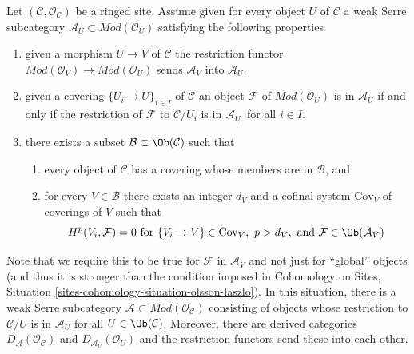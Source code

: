 \medskip\noindent
Let $(\mathcal{C}, \mathcal{O}_\mathcal{C})$ be a ringed site.
Assume given for every object $U$ of $\mathcal{C}$
a weak Serre subcategory $\mathcal{A}_U \subset \textit{Mod}(\mathcal{O}_U)$
satisfying the following properties
\begin{enumerate}
\item
\label{spaces-simplicial-item-restriction}
given a morphism $U \to V$ of $\mathcal{C}$ the restriction
functor $\textit{Mod}(\mathcal{O}_V) \to \textit{Mod}(\mathcal{O}_U)$
sends $\mathcal{A}_V$ into $\mathcal{A}_U$,
\item
\label{spaces-simplicial-item-local}
given a covering $\{U_i \to U\}_{i \in I}$ of $\mathcal{C}$
an object $\mathcal{F}$ of $\textit{Mod}(\mathcal{O}_U)$
is in $\mathcal{A}_U$ if and only if the restriction of
$\mathcal{F}$ to $\mathcal{C}/U_i$ is in $\mathcal{A}_{U_i}$
for all $i \in I$.
\item
\label{spaces-simplicial-item-bounded-dimension}
there exists a subset $\mathcal{B} \subset \Ob(\mathcal{C})$
such that
\begin{enumerate}
\item every object of $\mathcal{C}$ has a covering whose
members are in $\mathcal{B}$, and
\item for every $V \in \mathcal{B}$ there exists an integer $d_V$
and a cofinal system $\text{Cov}_V$ of coverings of $V$ such
that
$$
H^p(V_i, \mathcal{F}) = 0 \text{ for }
\{V_i \to V\} \in \text{Cov}_V,\ p > d_V, \text{ and }
\mathcal{F} \in \Ob(\mathcal{A}_V)
$$
\end{enumerate}
\end{enumerate}
Note that we require this to be true for $\mathcal{F}$ in
$\mathcal{A}_V$ and not just for ``global'' objects
(and thus it is stronger than the condition imposed in
Cohomology on Sites, Situation \ref{sites-cohomology-situation-olsson-laszlo}).
In this situation, there is a weak Serre subcategory
$\mathcal{A} \subset \textit{Mod}(\mathcal{O}_\mathcal{C})$
consisting of objects whose restriction to $\mathcal{C}/U$
is in $\mathcal{A}_U$ for all $U \in \Ob(\mathcal{C})$.
Moreover, there are derived categories
$D_\mathcal{A}(\mathcal{O}_\mathcal{C})$ and
$D_{\mathcal{A}_U}(\mathcal{O}_U)$ and the restriction
functors send these into each other.

